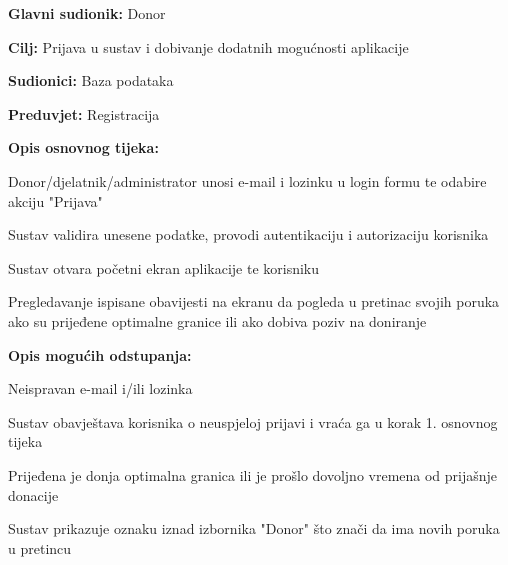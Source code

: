 \eject 
\noindent {}
					\begin{packed_item}
	
						\item \textbf{Glavni sudionik: }Donor
						\item \textbf{Cilj:} Prijava u sustav i dobivanje dodatnih mogućnosti aplikacije
						\item \textbf{Sudionici:} Baza podataka
						\item \textbf{Preduvjet:} Registracija
						\item \textbf{Opis osnovnog tijeka:}
						
						\item[] \begin{packed_enum}
	
							\item Donor/djelatnik/administrator unosi e-mail i lozinku u login formu te odabire akciju "Prijava"
							\item Sustav validira unesene podatke, provodi autentikaciju i autorizaciju korisnika
							\item Sustav otvara početni ekran aplikacije te korisniku 
							\item Pregledavanje ispisane obavijesti na ekranu da pogleda u pretinac svojih poruka ako su prijeđene optimalne granice ili ako dobiva poziv na doniranje
							
						\end{packed_enum}
						\item  \textbf{Opis mogućih odstupanja:}
						
						\item[] \begin{packed_item}
	
							\item[2.a] Neispravan e-mail i/ili lozinka
							\item[] \begin{packed_enum}
								
								\item  Sustav obavještava korisnika o neuspjeloj prijavi i vraća ga u korak 1. osnovnog tijeka
								\end{packed_enum}
							\item[3.a] Prijeđena je donja optimalna granica ili je prošlo dovoljno vremena od prijašnje donacije
							\item[] \begin{packed_enum}
								
								\item  Sustav prikazuje oznaku iznad izbornika "Donor" što znači da ima novih poruka u pretincu
							\end{packed_enum}
					\end{packed_item}
					\end{packed_item}
